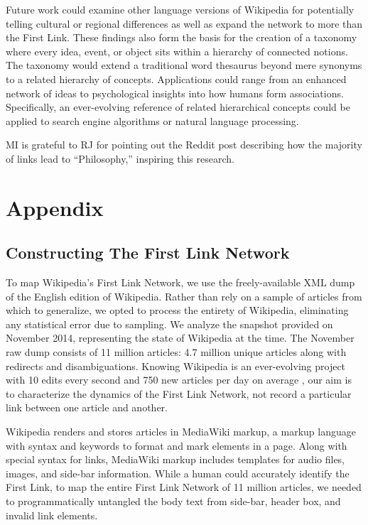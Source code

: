 \documentclass[11pt]{report}
\begin{document}
Future work could examine other language versions of Wikipedia for potentially telling cultural or regional differences as well as expand the network to more than the First Link.
These findings also form the basis for the creation of a taxonomy where 
every idea, event, or object sits within a hierarchy of connected notions.
The taxonomy would extend a traditional word thesaurus beyond mere synonyms to a related hierarchy of concepts.
Applications could range from an enhanced network of ideas to psychological insights into how humans form associations.
Specifically, an ever-evolving reference of related hierarchical concepts could be applied to search engine algorithms 
or natural language processing.


\acknowledgments
MI is grateful to RJ for pointing out the Reddit post 
\cite{reddit}
describing how the majority of links lead to ``Philosophy,'' inspiring this research.


\newpage

\section{Appendix}

\subsection{Constructing The First Link Network}

To map Wikipedia's First Link Network, we use the freely-available XML dump of the English edition of Wikipedia. 
Rather than rely on a sample of articles from which to generalize, we opted to process the entirety of Wikipedia, 
eliminating any statistical error due to sampling.
We analyze the snapshot provided on November 2014, representing the state of Wikipedia at the time.
The November raw dump consists of 11 million articles: 4.7 million unique articles along with redirects
and disambiguations.
Knowing Wikipedia is an ever-evolving project with 10 edits every second and 750 new articles per day on average
\cite{wiki_edits},
our aim is to characterize the dynamics of the First Link Network, not record a particular link between one
article and another.

Wikipedia renders and stores articles in MediaWiki markup, a markup language with syntax and keywords to format and mark elements in a page. Along with special syntax for links, MediaWiki markup includes templates for audio files, images, and side-bar
information.
While a human could accurately identify the First Link, to map the entire First Link Network of 11 million articles, we needed to programmatically untangled the body text from side-bar, header box, and invalid link elements.
\end{document}
